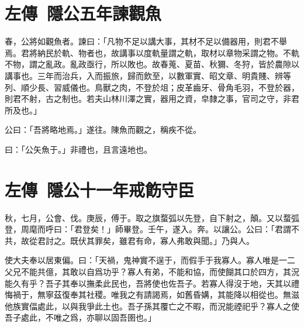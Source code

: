 \section[臧僖伯諫觀魚\quad{\small 左傳\ 隱公五年}]{{\normalsize 左傳\ 隱公五年}\quad {}諫觀魚}
春，公將如觀魚者。諫曰：「凡物不足以講大事，其材不足以備器用，則君不舉焉。君將納民於軌、物者也，故講事以度軌量謂之軌，取材以章物采謂之物。不軌不物，謂之亂政。亂政亟行，所以敗也。故春蒐、夏苗、秋獮、冬狩，皆於農隙以講事也。三年而治兵，入而振旅，歸而飲至，以數軍實、昭文章、明貴賤、辨等列、順少長、習威儀也。鳥獸之肉，不登於俎；皮革齒牙、骨角毛羽，不登於器，則{君}不射，古之制也。若夫山林川澤之實，器用之資，皁隸之事，官司之守，非君所及也。」

公曰：「吾將略地焉。」遂往。陳魚而觀之，稱疾不從。

曰：「公矢魚于。」非禮也，且言遠地也。
\nopagebreak
\theendnotes

\section[鄭莊公戒飭守臣\quad{\small 左傳\ 隱公十一年}]{{\normalsize 左傳\ 隱公十一年}\quad {}戒飭守臣}
秋，七月，公會、伐。庚辰，傅于。取之旗蝥弧以先登，自下射之，顛。又以蝥弧登，周麾而呼曰：「君登矣！」師畢登。壬午，遂入。奔。以讓公。公曰：「君謂不共，故從君討之。既伏其罪矣，雖君有命，寡人弗敢與聞。」乃與人。

使大夫奉以居東偏。曰：「天禍，鬼神實不逞于，而假手于我寡人。寡人唯是一二父兄不能共億，其敢以自爲功乎？寡人有弟，不能和協，而使餬其口於四方，其況能久有乎？吾子其奉以撫柔此民也，吾將使也佐吾子。若寡人得沒于地，天其以禮悔禍于，無寧茲復奉其社稷。唯我之有請謁焉，如舊昏媾，其能降以相從也。無滋他族實偪處此，以與我爭此土也。吾子孫其覆亡之不暇，而況能禋祀乎？寡人之使吾子處此，不唯之爲，亦聊以固吾圉也。」

